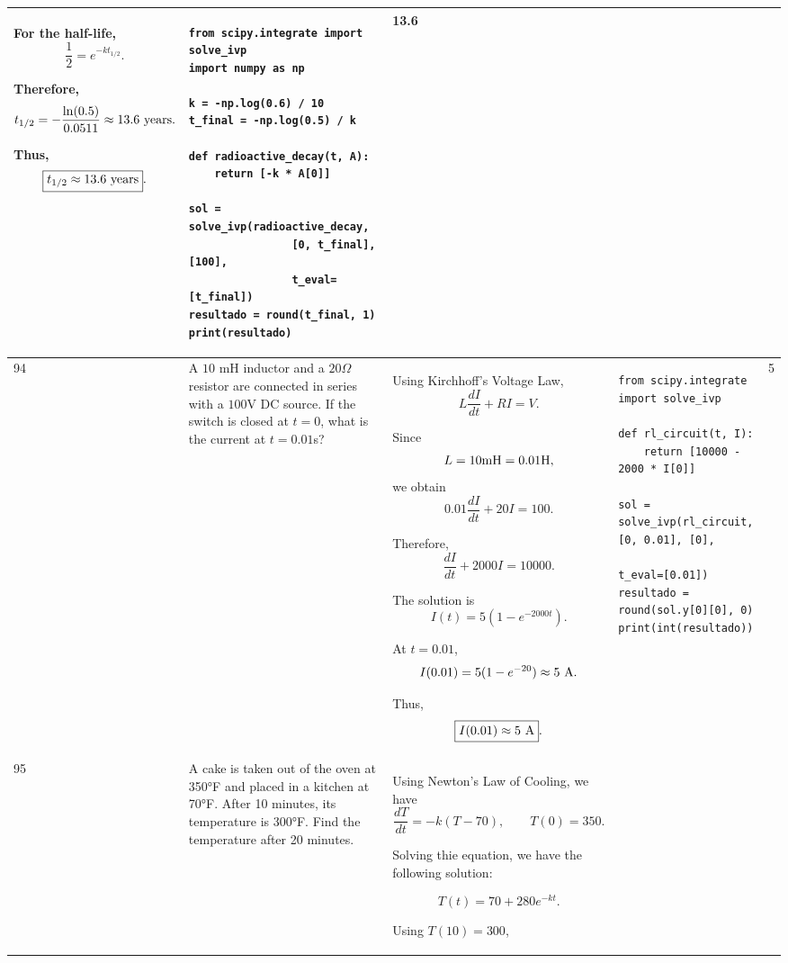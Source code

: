 \documentclass[a4paper,12pt]{article}
\begin{document}
\begin{longtable}{|p{0.3cm}|p{}|p{10cm}|p{}|p{1.5cm}|}
For the half-life,
\[
\frac{1}{2}=e^{-kt_{1/2}}.
\]

Therefore,
\[
t_{1/2}
=-\frac{\ln(0.5)}{0.0511}
\approx13.6\ {\rm years}.
\]

Thus,
\[
\boxed{t_{1/2}\approx13.6\ {\rm years}}.
\]
&
\begin{verbatim}
from scipy.integrate import solve_ivp
import numpy as np

k = -np.log(0.6) / 10
t_final = -np.log(0.5) / k

def radioactive_decay(t, A):
    return [-k * A[0]]

sol = solve_ivp(radioactive_decay,
                [0, t_final], [100],
                t_eval=[t_final])
resultado = round(t_final, 1)
print(resultado)
\end{verbatim}
&
13.6 \\
\hline

94 &
A $10$ mH inductor and a $20\Omega$ resistor are connected in series with a $100$V DC source. If the switch is closed at $t=0$, what is the current at $t=0.01$s? &
Using Kirchhoff's Voltage Law,
\[
L\frac{dI}{dt}+RI=V.
\]

Since
\[
L=10{\rm mH}=0.01{\rm H},
\]
we obtain
\[
0.01\frac{dI}{dt}+20I=100.
\]

Therefore,
\[
\frac{dI}{dt}+2000I=10000.
\]

The solution is
\[
I(t)=5\left(1-e^{-2000t}\right).
\]

At $t=0.01$,
\[
I(0.01)
=
5(1-e^{-20})
\approx5\ {\rm A}.
\]

Thus,
\[
\boxed{I(0.01)\approx5\ {\rm A}}.
\]
&
\begin{verbatim}
from scipy.integrate import solve_ivp

def rl_circuit(t, I):
    return [10000 - 2000 * I[0]]

sol = solve_ivp(rl_circuit, [0, 0.01], [0],
                t_eval=[0.01])
resultado = round(sol.y[0][0], 0)
print(int(resultado))
\end{verbatim}
&
5 \\ \hline
95 & A cake is taken out of the oven at 350°F and placed in a kitchen at 70°F. After 10 minutes, its temperature is 300°F. Find the temperature after 20 minutes.  & Using Newton’s Law of Cooling, we have \[
\frac{dT}{dt}=-k(T-70), \qquad T(0)=350.
\]

Solving thie equation, we have the following solution:

\[
T(t)=70+280e^{-kt}.
\]

Using \(T(10)=300\),


\end{longtable}
\end{document}

